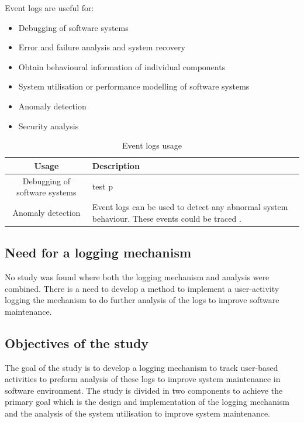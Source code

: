 Event logs are useful for:
\begin{itemize}
    \item Debugging of software systems
    \item Error and failure analysis and system recovery
    \item Obtain behavioural information of individual components
    \item System utilisation or performance modelling of software systems
    \item Anomaly detection
    \item Security analysis
\end{itemize}

\clearpage

\begin{table}[!htb]
    \centering
    \small
    \caption{Event logs usage}
    \label{tbl:CH1_EventLogsUsage}
    \begin{tabularx}{\textwidth}{|c|X|}
        \hline \textbf{Usage} & \textbf{Description} \\
        \hline Debugging of software systems & test p\\
        \hline Anomaly detection & Event logs can be used to detect any abnormal system behaviour. These events could be traced \cite{Dwyer2013}. \\
        \hline
    \end{tabularx}
\end{table}

\subsection{Need for a logging mechanism}
No study was found where both the logging mechanism and analysis were combined.
There is a need to develop a method to implement a user-activity logging
the mechanism to do further analysis of the logs to improve software
maintenance.

\subsection{Objectives of the study}
The goal of the study is to develop a logging mechanism to track user-based
activities to preform analysis of these logs to improve system maintenance in
software environment. The study is divided in two components to achieve the
primary goal which is the design and implementation of the logging mechanism
and the analysis of the system utilisation to improve system maintenance.

